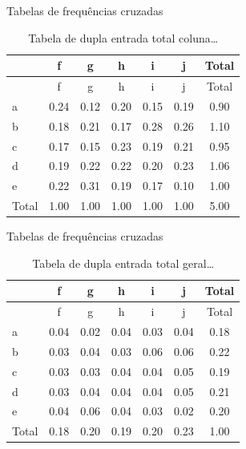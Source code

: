 \documentclass[
  ignorenonframetext,
  serif,
  professionalfont,
  usenames,
  dvipsnames,
  aspectratio = 169]{beamer}
\begin{document}
\begin{frame}{Tabelas de frequências cruzadas}
\protect\hypertarget{tabelas-de-frequuxeancias-cruzadas-3}{}
\begin{longtable}[]{@{}lcccccc@{}}
\caption{Tabela de dupla entrada total coluna\ldots{}}\tabularnewline
\toprule()
& f & g & h & i & j & Total \\
\midrule()
\endfirsthead
\toprule()
& f & g & h & i & j & Total \\
\midrule()
\endhead
a & 0.24 & 0.12 & 0.20 & 0.15 & 0.19 & 0.90 \\
b & 0.18 & 0.21 & 0.17 & 0.28 & 0.26 & 1.10 \\
c & 0.17 & 0.15 & 0.23 & 0.19 & 0.21 & 0.95 \\
d & 0.19 & 0.22 & 0.22 & 0.20 & 0.23 & 1.06 \\
e & 0.22 & 0.31 & 0.19 & 0.17 & 0.10 & 1.00 \\
Total & 1.00 & 1.00 & 1.00 & 1.00 & 1.00 & 5.00 \\
\bottomrule()
\end{longtable}
\end{frame}

\begin{frame}{Tabelas de frequências cruzadas}
\protect\hypertarget{tabelas-de-frequuxeancias-cruzadas-4}{}
\begin{longtable}[]{@{}lcccccc@{}}
\caption{Tabela de dupla entrada total geral\ldots{}}\tabularnewline
\toprule()
& f & g & h & i & j & Total \\
\midrule()
\endfirsthead
\toprule()
& f & g & h & i & j & Total \\
\midrule()
\endhead
a & 0.04 & 0.02 & 0.04 & 0.03 & 0.04 & 0.18 \\
b & 0.03 & 0.04 & 0.03 & 0.06 & 0.06 & 0.22 \\
c & 0.03 & 0.03 & 0.04 & 0.04 & 0.05 & 0.19 \\
d & 0.03 & 0.04 & 0.04 & 0.04 & 0.05 & 0.21 \\
e & 0.04 & 0.06 & 0.04 & 0.03 & 0.02 & 0.20 \\
Total & 0.18 & 0.20 & 0.19 & 0.20 & 0.23 & 1.00 \\
\bottomrule()
\end{longtable}
\end{frame}
\end{document}
